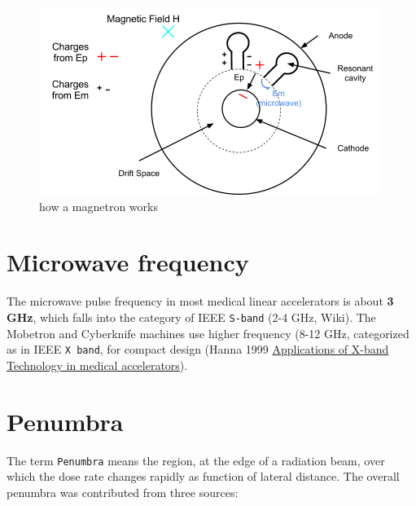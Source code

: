 \documentclass[]{book}
\theoremstyle{definition}
\theoremstyle{definition}
\theoremstyle{definition}
\theoremstyle{remark}
\begin{document}
\begin{figure}

{\centering \includegraphics{figures/magnetron} 

}

\caption{how a magnetron works}\label{fig:unnamed-chunk-5}
\end{figure}

\section{Microwave frequency}\label{microwave-frequency}

The microwave pulse frequency in most medical linear accelerators is
about \textbf{3 GHz}, which falls into the category of IEEE
\texttt{S-band} (2-4 GHz, Wiki). The Mobetron and Cyberknife machines
use higher frequency (8-12 GHz, categorized as in IEEE \texttt{X\ band},
for compact design (Hanna 1999
\href{https://accelconf.web.cern.ch/AccelConf/p99/PAPERS/WEP114.PDF}{Applications
of X-band Technology in medical accelerators}).

\section{Penumbra}\label{penumbra}

The term \texttt{Penumbra} means the region, at the edge of a radiation
beam, over which the dose rate changes rapidly as function of lateral
distance. The overall penumbra was contributed from three sources:
\end{document}
